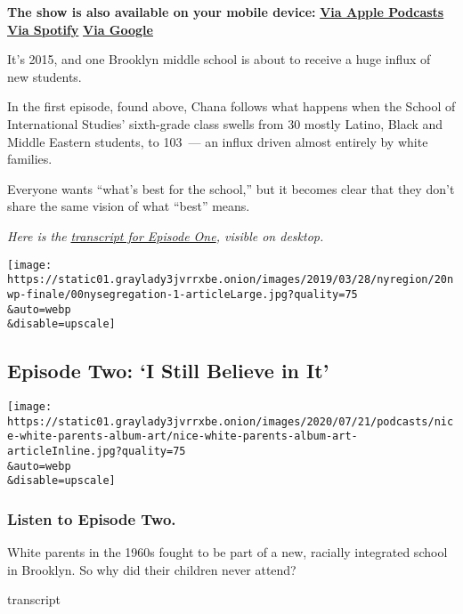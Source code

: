 \textbf{The show is also available on your mobile device:}
\textbf{\href{https://podcasts.apple.com/us/podcast/nice-white-parents/id1524080195}{Via
Apple Podcasts}} \textbf{\textbar{}}
\textbf{\href{https://open.spotify.com/show/7oBSLCZFCgpdCaBjIG8mLV?si=YcEPLD3xT2ejXmpQz-tRpw}{Via
Spotify}} \textbf{\textbar{}}
\textbf{\href{https://podcasts.google.com/feed/aHR0cHM6Ly9yc3MuYXJ0MTkuY29tL25pY2Utd2hpdGUtcGFyZW50cw}{Via
Google}}

It's 2015, and one Brooklyn middle school is about to receive a huge
influx of new students.

In the first episode, found above, Chana follows what happens when the
School of International Studies' sixth-grade class swells from 30 mostly
Latino, Black and Middle Eastern students, to 103~--- an influx driven
almost entirely by white families.

Everyone wants ``what's best for the school,'' but it becomes clear that
they don't share the same vision of what ``best'' means.

\emph{Here is the}
\href{https://www.nytimes3xbfgragh.onion/2020/07/30/podcasts/nice-white-parents-serial.html?showTranscript=1}{\emph{transcript
for Episode One}}\emph{, visible on desktop.}

\texttt{[image: https://static01.graylady3jvrrxbe.onion/images/2019/03/28/nyregion/20nwp-finale/00nysegregation-1-articleLarge.jpg?quality=75\\\&auto=webp\\\&disable=upscale]}

\hypertarget{episode-two-i-still-believe-in-it}{%
\subsection{Episode Two: `I Still Believe in
It'}\label{episode-two-i-still-believe-in-it}}

\texttt{[image: https://static01.graylady3jvrrxbe.onion/images/2020/07/21/podcasts/nice-white-parents-album-art/nice-white-parents-album-art-articleInline.jpg?quality=75\\\&auto=webp\\\&disable=upscale]}

\hypertarget{listen-to-episode-two}{%
\subsubsection{Listen to Episode Two.}\label{listen-to-episode-two}}

White parents in the 1960s fought to be part of a new, racially
integrated school in Brooklyn. So why did their children never attend?

transcript

